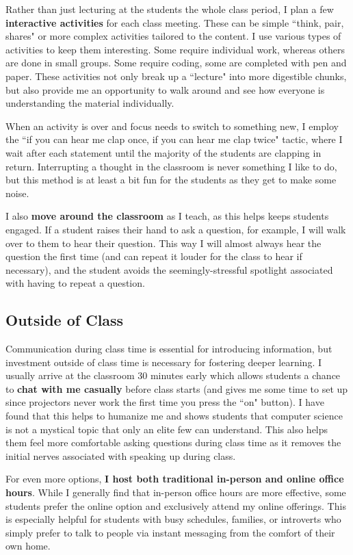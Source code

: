 \documentclass[12pt]{amsart} \usepackage{amssymb}
\begin{document}
Rather than just lecturing at the students the whole class period, I plan a few \textbf{interactive activities} for each class meeting. These can be simple ``think, pair, shares" or more complex activities tailored to the content. I use various types of activities to keep them interesting. Some require individual work, whereas others are done in small groups. Some require coding, some are completed with pen and paper. These activities not only break up a ``lecture" into more digestible chunks, but also provide me an opportunity to walk around and see how everyone is understanding the material individually.

When an activity is over and focus needs to switch to something new, I employ the ``if you can hear me clap once, if you can hear me clap twice" tactic, where I wait after each statement until the majority of the students are clapping in return. Interrupting a thought in the classroom is never something I like to do, but this method is at least a bit fun for the students as they get to make some noise.

I also \textbf{move around the classroom} as I teach, as this helps keeps students engaged. If a student raises their hand to ask a question, for example, I will walk over to them to hear their question. This way I will almost always hear the question the first time (and can repeat it louder for the class to hear if necessary), and the student avoids the seemingly-stressful spotlight associated with having to repeat a question.
\vspace{1cm}

\subsection*{Outside of Class}
Communication during class time is essential for introducing information, but investment outside of class time is necessary for fostering deeper learning. I usually arrive at the classroom 30 minutes early which allows students a chance to \textbf{chat with me casually} before class starts (and gives me some time to set up since projectors never work the first time you press the ``on" button). I have found that this helps to humanize me and shows students that computer science is not a mystical topic that only an elite few can understand. This also helps them feel more comfortable asking questions during class time as it removes the initial nerves associated with speaking up during class.

For even more options, \textbf{I host both traditional in-person and online office hours}. While I generally find that in-person office hours are more effective, some students prefer the online option and exclusively attend my online offerings. This is especially helpful for students with busy schedules, families, or introverts who simply prefer to talk to people via instant messaging from the comfort of their own home.
\end{document}

